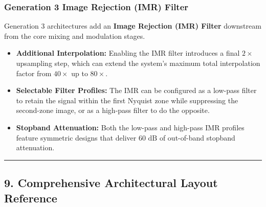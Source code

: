 \documentclass[
]{article}
\providecommand{\tightlist}{%
  \setlength{\itemsep}{0pt}\setlength{\parskip}{0pt}}
\begin{document}
\subsubsection{Generation 3 Image Rejection (IMR)
Filter}\label{generation-3-image-rejection-imr-filter}

Generation 3 architectures add an \textbf{Image Rejection (IMR) Filter}
downstream from the core mixing and modulation stages.

\begin{itemize}
\tightlist
\item
  \textbf{Additional Interpolation:} Enabling the IMR filter introduces
  a final \(2\times\) upsampling step, which can extend the system's
  maximum total interpolation factor from \(40\times\) up to
  \textbf{\(80\times\)}.
\item
  \textbf{Selectable Filter Profiles:} The IMR can be configured as a
  low-pass filter to retain the signal within the first Nyquist zone
  while suppressing the second-zone image, or as a high-pass filter to
  do the opposite.
\item
  \textbf{Stopband Attenuation:} Both the low-pass and high-pass IMR
  profiles feature symmetric designs that deliver \(60\text{ dB}\) of
  out-of-band stopband attenuation.
\end{itemize}

\begin{center}\rule{0.5\linewidth}{0.5pt}\end{center}

\subsection{9. Comprehensive Architectural Layout
Reference}\label{comprehensive-architectural-layout-reference}
\end{document}
